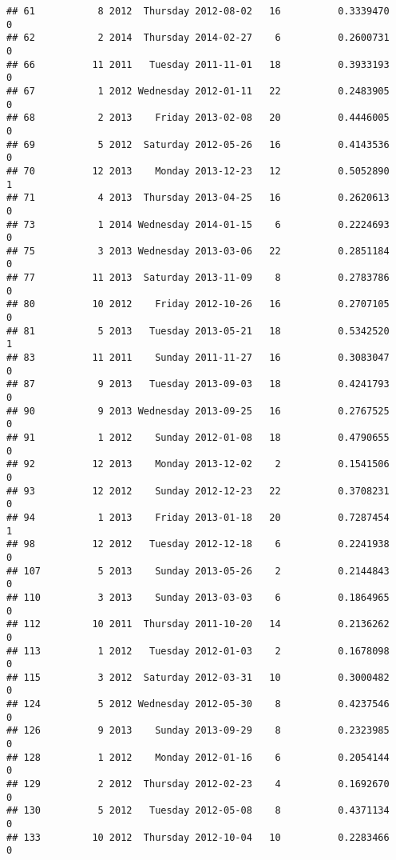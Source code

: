 \documentclass[
]{article}
\begin{document}
\begin{verbatim}
## 61           8 2012  Thursday 2012-08-02   16          0.3339470             0
## 62           2 2014  Thursday 2014-02-27    6          0.2600731             0
## 66          11 2011   Tuesday 2011-11-01   18          0.3933193             0
## 67           1 2012 Wednesday 2012-01-11   22          0.2483905             0
## 68           2 2013    Friday 2013-02-08   20          0.4446005             0
## 69           5 2012  Saturday 2012-05-26   16          0.4143536             0
## 70          12 2013    Monday 2013-12-23   12          0.5052890             1
## 71           4 2013  Thursday 2013-04-25   16          0.2620613             0
## 73           1 2014 Wednesday 2014-01-15    6          0.2224693             0
## 75           3 2013 Wednesday 2013-03-06   22          0.2851184             0
## 77          11 2013  Saturday 2013-11-09    8          0.2783786             0
## 80          10 2012    Friday 2012-10-26   16          0.2707105             0
## 81           5 2013   Tuesday 2013-05-21   18          0.5342520             1
## 83          11 2011    Sunday 2011-11-27   16          0.3083047             0
## 87           9 2013   Tuesday 2013-09-03   18          0.4241793             0
## 90           9 2013 Wednesday 2013-09-25   16          0.2767525             0
## 91           1 2012    Sunday 2012-01-08   18          0.4790655             0
## 92          12 2013    Monday 2013-12-02    2          0.1541506             0
## 93          12 2012    Sunday 2012-12-23   22          0.3708231             0
## 94           1 2013    Friday 2013-01-18   20          0.7287454             1
## 98          12 2012   Tuesday 2012-12-18    6          0.2241938             0
## 107          5 2013    Sunday 2013-05-26    2          0.2144843             0
## 110          3 2013    Sunday 2013-03-03    6          0.1864965             0
## 112         10 2011  Thursday 2011-10-20   14          0.2136262             0
## 113          1 2012   Tuesday 2012-01-03    2          0.1678098             0
## 115          3 2012  Saturday 2012-03-31   10          0.3000482             0
## 124          5 2012 Wednesday 2012-05-30    8          0.4237546             0
## 126          9 2013    Sunday 2013-09-29    8          0.2323985             0
## 128          1 2012    Monday 2012-01-16    6          0.2054144             0
## 129          2 2012  Thursday 2012-02-23    4          0.1692670             0
## 130          5 2012   Tuesday 2012-05-08    8          0.4371134             0
## 133         10 2012  Thursday 2012-10-04   10          0.2283466             0

\end{verbatim}
\end{document}
